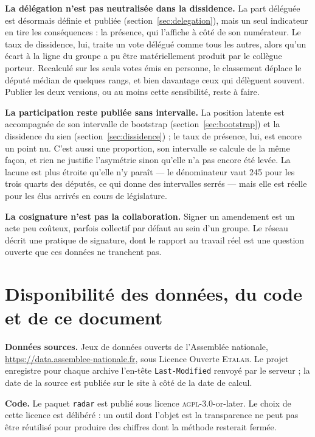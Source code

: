 \documentclass[11pt,a4paper]{article}
\newcommand{\code}[1]{\texttt{#1}}
\begin{document}
\textbf{La délégation n'est pas neutralisée dans la dissidence.} La part
déléguée est désormais définie et publiée (section~\ref{sec:delegation}), mais
un seul indicateur en tire les conséquences : la présence, qui l'affiche à côté
de son numérateur. Le taux de dissidence, lui, traite un vote délégué comme
tous les autres, alors qu'un écart à la ligne du groupe a pu être matériellement
produit par le collègue porteur. Recalculé sur les seuls votes émis en personne,
le classement déplace le député médian de quelques rangs, et bien davantage ceux
qui délèguent souvent. Publier les deux versions, ou au moins cette sensibilité,
reste à faire.

\textbf{La participation reste publiée sans intervalle.} La position latente est
accompagnée de son intervalle de bootstrap (section~\ref{sec:bootstrap}) et la
dissidence du sien (section~\ref{sec:dissidence}) ; le taux de présence, lui,
est encore un point nu. C'est aussi une proportion, son intervalle se calcule de
la même façon, et rien ne justifie l'asymétrie sinon qu'elle n'a pas encore été
levée. La lacune est plus étroite qu'elle n'y paraît — le dénominateur vaut 245
pour les trois quarts des députés, ce qui donne des intervalles serrés — mais
elle est réelle pour les élus arrivés en cours de législature.

\textbf{La cosignature n'est pas la collaboration.} Signer un amendement est un
acte peu coûteux, parfois collectif par défaut au sein d'un groupe. Le réseau
décrit une pratique de signature, dont le rapport au travail réel est une
question ouverte que ces données ne tranchent pas.

\section{Disponibilité des données, du code et de ce document}

\textbf{Données sources.} Jeux de données ouverts de l'Assemblée nationale,
\url{https://data.assemblee-nationale.fr}, sous Licence Ouverte
\textsc{Etalab}. Le projet enregistre pour chaque archive l'en-tête
\code{Last-Modified} renvoyé par le serveur ; la date de la source est publiée
sur le site à côté de la date de calcul.

\textbf{Code.} Le paquet \code{radar} est publié sous licence
\textsc{agpl}-3.0-or-later. Le choix de cette licence est délibéré : un
outil dont l'objet est la transparence ne peut pas être réutilisé pour
produire des chiffres dont la méthode resterait fermée.
\end{document}
